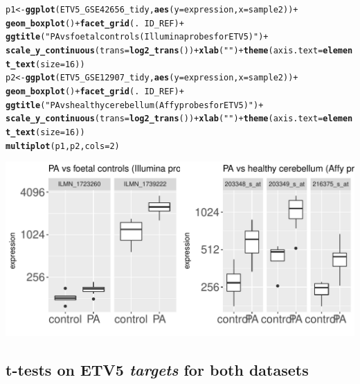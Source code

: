 \documentclass{article}\usepackage[]{graphicx}\usepackage[]{color}
\makeatletter
\def\maxwidth{ %
  \ifdim\Gin@nat@width>\linewidth
    \linewidth
  \else
    \Gin@nat@width
  \fi
}
\newcommand{\hlnum}[1]{\textcolor[rgb]{0.686,0.059,0.569}{#1}}%
\newcommand{\hlstr}[1]{\textcolor[rgb]{0.192,0.494,0.8}{#1}}%
\newcommand{\hlopt}[1]{\textcolor[rgb]{0,0,0}{#1}}%
\newcommand{\hlstd}[1]{\textcolor[rgb]{0.345,0.345,0.345}{#1}}%
\newcommand{\hlkwb}[1]{\textcolor[rgb]{0.69,0.353,0.396}{#1}}%
\newcommand{\hlkwc}[1]{\textcolor[rgb]{0.333,0.667,0.333}{#1}}%
\newcommand{\hlkwd}[1]{\textcolor[rgb]{0.737,0.353,0.396}{\textbf{#1}}}%
\newenvironment{kframe}{%
 \def\at@end@of@kframe{}%
 \ifinner\ifhmode%
  \def\at@end@of@kframe{\end{minipage}}%
  \begin{minipage}{\columnwidth}%
 \fi\fi%
 \def\FrameCommand##1{\hskip\@totalleftmargin \hskip-\fboxsep
 \colorbox{shadecolor}{##1}\hskip-\fboxsep
     \hskip-\linewidth \hskip-\@totalleftmargin \hskip\columnwidth}%
 \MakeFramed {\advance\hsize-\width
   \@totalleftmargin\z@ \linewidth\hsize
   \@setminipage}}%
 {\par\unskip\endMakeFramed%
 \at@end@of@kframe}
\newenvironment{knitrout}{}{} %
\makeatother
\begin{document}
\begin{knitrout}
\begin{kframe}\begin{alltt}
\hlstd{p1} \hlkwb{<-} \hlkwd{ggplot}\hlstd{(ETV5_GSE42656_tidy,} \hlkwd{aes}\hlstd{(}\hlkwc{y}\hlstd{=expression,} \hlkwc{x}\hlstd{=sample2))} \hlopt{+}
  \hlkwd{geom_boxplot}\hlstd{()} \hlopt{+} \hlkwd{facet_grid}\hlstd{(.}\hlopt{~}\hlstd{ID_REF)} \hlopt{+}
  \hlkwd{ggtitle}\hlstd{(}\hlstr{"PA vs foetal controls (Illumina probes for ETV5)"}\hlstd{)} \hlopt{+}
  \hlkwd{scale_y_continuous}\hlstd{(}\hlkwc{trans}\hlstd{=}\hlkwd{log2_trans}\hlstd{())} \hlopt{+} \hlkwd{xlab}\hlstd{(}\hlstr{""}\hlstd{)} \hlopt{+} \hlkwd{theme}\hlstd{(}\hlkwc{axis.text}\hlstd{=}\hlkwd{element_text}\hlstd{(}\hlkwc{size}\hlstd{=}\hlnum{16}\hlstd{))}
\hlstd{p2} \hlkwb{<-} \hlkwd{ggplot}\hlstd{(ETV5_GSE12907_tidy,} \hlkwd{aes}\hlstd{(}\hlkwc{y}\hlstd{=expression,} \hlkwc{x}\hlstd{=sample2))} \hlopt{+}
  \hlkwd{geom_boxplot}\hlstd{()} \hlopt{+} \hlkwd{facet_grid}\hlstd{(.}\hlopt{~}\hlstd{ID_REF)} \hlopt{+}
  \hlkwd{ggtitle}\hlstd{(}\hlstr{"PA vs healthy cerebellum (Affy probes for ETV5)"}\hlstd{)} \hlopt{+}
  \hlkwd{scale_y_continuous}\hlstd{(}\hlkwc{trans}\hlstd{=}\hlkwd{log2_trans}\hlstd{())} \hlopt{+} \hlkwd{xlab}\hlstd{(}\hlstr{""}\hlstd{)} \hlopt{+} \hlkwd{theme}\hlstd{(}\hlkwc{axis.text}\hlstd{=}\hlkwd{element_text}\hlstd{(}\hlkwc{size}\hlstd{=}\hlnum{16}\hlstd{))}
\hlkwd{multiplot}\hlstd{(p1,p2,}\hlkwc{cols}\hlstd{=}\hlnum{2}\hlstd{)}
\end{alltt}
\end{kframe}
\includegraphics[width=\maxwidth]{figure/unnamed-chunk-23-5} 

\end{knitrout}


\subsection{t-tests on ETV5 {\it targets} for both datasets}
\end{document}
